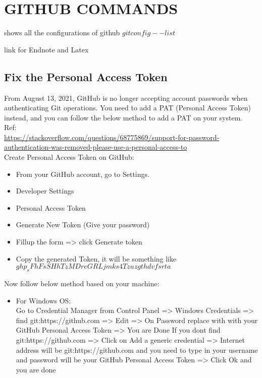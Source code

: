 \section{GITHUB COMMANDS}
shows all the configurations of github
$git config --list$

link for Endnote and Latex

\subsection{Fix the Personal Access Token}
From August 13, 2021, GitHub is no longer accepting account passwords 
when authenticating Git operations. 
You need to add a PAT (Personal Access Token) instead, 
and you can follow the below method to add a PAT on your system.\\

Ref:\\
\url{https://stackoverflow.com/questions/68775869/support-for-password-authentication-was-removed-please-use-a-personal-access-to}\\
    
Create Personal Access Token on GitHub:
    \begin{itemize}
        \item From your GitHub account, go to Settings.
        \item Developer Settings 
        \item Personal Access Token
        \item Generate New Token (Give your password)
        \item Fillup the form => click Generate token
        \item Copy the generated Token, it will be something like $ghp_sFhFsSHhTzMDreGRLjmks4Tzuzgthdvfsrta$
    \end{itemize}
    Now follow below method based on your machine:
    \begin{itemize}
        \item For Windows OS:\\
                Go to Credential Manager from Control Panel => 
                Windows Credentials => 
                find git:https://github.com => 
                Edit => 
                On Password replace with with your GitHub Personal Access Token => You are Done
                If you dont find git:https://github.com => Click on Add a generic credential => Internet address will be git:https://github.com and you need to type in your username and password will be your GitHub Personal Access Token => Click Ok and you are done
    \end{itemize}


